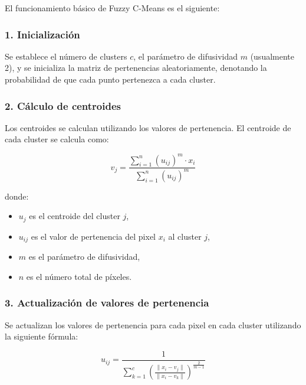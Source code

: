 El funcionamiento básico de Fuzzy C-Means es el siguiente:

\subsubsection{1. Inicialización}

Se establece el número de clusters $c$, el parámetro de difusividad $m$ (usualmente 2), y se inicializa la matriz de pertenencias aleatoriamente, denotando la probabilidad de que cada punto pertenezca a cada cluster.

\subsubsection{2. Cálculo de centroides}

Los centroides se calculan utilizando los valores de pertenencia. El centroide de cada cluster se calcula como: 

$$v_j =\frac{\sum_{i=1}^n (u_{ij} )^m \cdot x_i }{\sum_{i=1}^n (u_{ij} )^m }$$

donde:

\begin{itemize}
\setlength{\itemsep}{-1ex}
   \item{\begin{flushleft} $u_j$ es el centroide del cluster $j$, \end{flushleft}}
   \item{\begin{flushleft} $u_{ij}$ es el valor de pertenencia del pixel $x_i$ al cluster $j$, \end{flushleft}}
   \item{\begin{flushleft} $m$ es el parámetro de difusividad, \end{flushleft}}
   \item{\begin{flushleft} $n$ es el número total de píxeles. \end{flushleft}}
\end{itemize}

\subsubsection{3. Actualización de valores de pertenencia}

Se actualizan los valores de pertenencia para cada pixel en cada cluster utilizando la siguiente fórmula:

$$u_{ij} =\frac{1}{\sum_{k=1}^c {\left(\frac{\|x_i -v_j \|}{\|x_i -v_k \|}\right)}^{\frac{2}{m-1}} }$$

